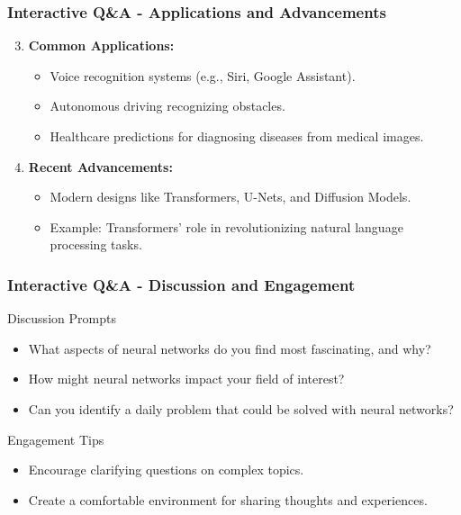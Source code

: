 \documentclass[aspectratio=169]{beamer}
\begin{document}
\begin{frame}[fragile]
    \frametitle{Interactive Q\&A - Applications and Advancements}
    \begin{enumerate}
        \setcounter{enumi}{2}
        \item \textbf{Common Applications:}
            \begin{itemize}
                \item Voice recognition systems (e.g., Siri, Google Assistant).
                \item Autonomous driving recognizing obstacles.
                \item Healthcare predictions for diagnosing diseases from medical images.
            \end{itemize}
        \item \textbf{Recent Advancements:}
            \begin{itemize}
                \item Modern designs like Transformers, U-Nets, and Diffusion Models.
                \item Example: Transformers' role in revolutionizing natural language processing tasks.
            \end{itemize}
    \end{enumerate}
\end{frame}

\begin{frame}[fragile]
    \frametitle{Interactive Q\&A - Discussion and Engagement}
    \begin{block}{Discussion Prompts}
        \begin{itemize}
            \item What aspects of neural networks do you find most fascinating, and why?
            \item How might neural networks impact your field of interest?
            \item Can you identify a daily problem that could be solved with neural networks?
        \end{itemize}
    \end{block}
    \begin{block}{Engagement Tips}
        \begin{itemize}
            \item Encourage clarifying questions on complex topics.
            \item Create a comfortable environment for sharing thoughts and experiences.
        \end{itemize}
    \end{block}
\end{frame}
\end{document}
